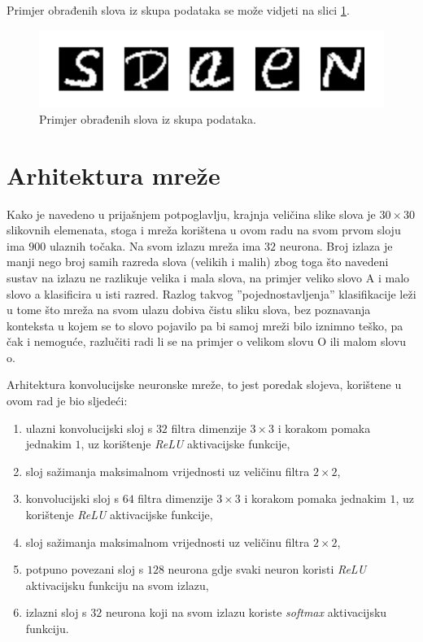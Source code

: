 Primjer obrađenih slova iz skupa podataka se može vidjeti na slici \ref{fig:dataset_example}.

\begin{figure}[htb]
    \centering
    \includegraphics[width=11.5cm]{images/dataset_example.pdf}
    \caption{Primjer obrađenih slova iz skupa podataka.}
    \label{fig:dataset_example}
\end{figure}

\section{Arhitektura mreže}

Kako je navedeno u prijašnjem potpoglavlju, krajnja veličina slike slova je $30 \times 30$ slikovnih elemenata, stoga i mreža korištena u ovom radu na svom prvom sloju ima $900$ ulaznih točaka. Na svom izlazu mreža ima $32$ neurona. Broj izlaza je manji nego broj samih razreda slova (velikih i malih) zbog toga što navedeni sustav na izlazu ne razlikuje velika i mala slova, na primjer veliko slovo A i malo slovo a klasificira u isti razred. Razlog takvog ''pojednostavljenja'' klasifikacije leži u tome što mreža na svom ulazu dobiva čistu sliku slova, bez poznavanja konteksta u kojem se to slovo pojavilo pa bi samoj mreži bilo iznimno teško, pa čak i nemoguće, razlučiti radi li se na primjer o velikom slovu O ili malom slovu o.

Arhitektura konvolucijske neuronske mreže, to jest poredak slojeva, korištene u ovom rad je bio sljedeći:

\begin{enumerate}
    \item ulazni konvolucijski sloj s $32$ filtra dimenzije $3 \times 3$ i korakom pomaka jednakim $1$, uz korištenje \emph{ReLU} aktivacijske funkcije,
    \item sloj sažimanja maksimalnom vrijednosti uz veličinu filtra $2 \times 2$,
    \item konvolucijski sloj s $64$ filtra dimenzije $3 \times 3$ i korakom pomaka jednakim $1$, uz korištenje \emph{ReLU} aktivacijske funkcije,
    \item sloj sažimanja maksimalnom vrijednosti uz veličinu filtra $2 \times 2$,
    \item potpuno povezani sloj s $128$ neurona gdje svaki neuron koristi \emph{ReLU} aktivacijsku funkciju na svom izlazu,
    \item izlazni sloj s $32$ neurona koji na svom izlazu koriste \emph{softmax} aktivacijsku funkciju.
\end{enumerate}

